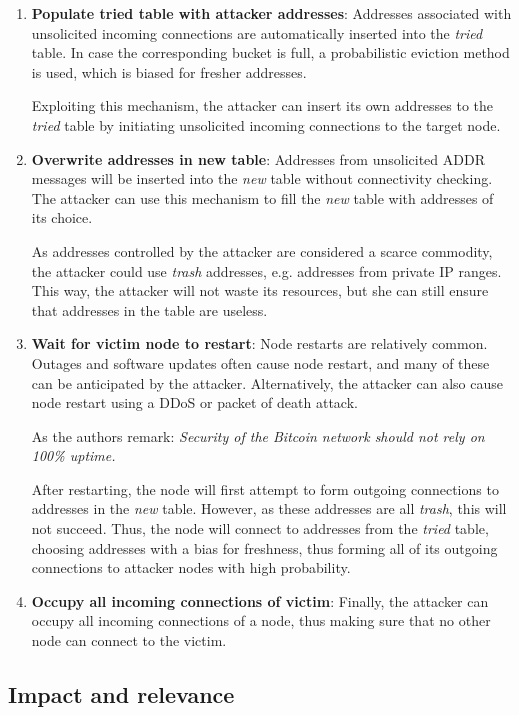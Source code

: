 \documentclass[12pt]{article}
\begin{document}
\begin{enumerate}
    \item \textbf{Populate tried table with attacker addresses}: Addresses associated with unsolicited incoming connections are automatically inserted into the \emph{tried} table. In case the corresponding bucket is full, a probabilistic eviction method is used, which is biased for fresher addresses.
    
Exploiting this mechanism, the attacker can insert its own addresses to the \emph{tried} table by initiating unsolicited incoming connections to the target node.

    \item \textbf{Overwrite addresses in new table}: Addresses from unsolicited ADDR messages will be inserted into the \emph{new} table without connectivity checking. The attacker can use this mechanism to fill the \emph{new} table with addresses of its choice.
    
As addresses controlled by the attacker are considered a scarce commodity, the attacker could use \emph{trash} addresses, e.g. addresses from private IP ranges. This way, the attacker will not waste its resources, but she can still ensure that addresses in the table are useless.

    \item \textbf{Wait for victim node to restart}: Node restarts are relatively common. Outages and software updates often cause node restart, and many of these can be anticipated by the attacker. Alternatively, the attacker can also cause node restart using a DDoS or packet of death attack.

As the authors remark: \emph{Security of the Bitcoin network should not rely on 100\% uptime.}

After restarting, the node will first attempt to form outgoing connections to addresses in the \emph{new} table. However, as these addresses are all \emph{trash}, this will not succeed. Thus, the node will connect to addresses from the \emph{tried} table, choosing addresses with a bias for freshness, thus forming all of its outgoing connections to attacker nodes with high probability.

    \item \textbf{Occupy all incoming connections of victim}: Finally, the attacker can occupy all incoming connections of a node, thus making sure that no other node can connect to the victim.
\end{enumerate}

\subsection{Impact and relevance}
\end{document}
